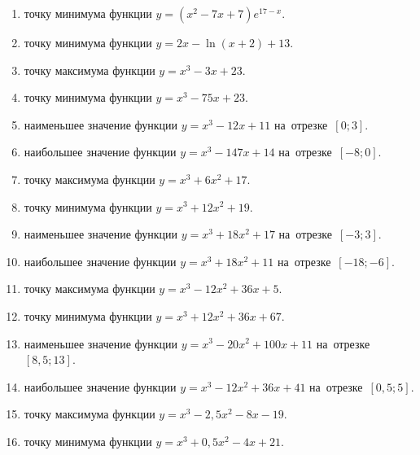 \documentclass[a4paper,10pt]{article}
\begin{document}
\begin{enumerate}
\item {} точку минимума функции $y=\left(x^2-7x+7\right){{e}^{17-x}}$.

\item {} точку минимума функции $y=2x-\ln \left(x+2\right)+13$.

\item {} точку максимума функции $y=x^3 -3x +23$.

\item {} точку минимума функции $y=x^3 -75x+23$.

\item {} наименьшее значение функции $y=x^3 -12x+11$ на~отрезке~$\left[0;3\right]$.

\item {} наибольшее значение функции $y=x^3 -147x+14$ на~отрезке~$\left[-8;0\right]$.

\item {} точку максимума функции $y=x^3 +6x^2+17$.

\item {} точку минимума функции $y=x^3 +12x^2+19$.

\item {} наименьшее значение функции $y=x^3 +18x^2+17$ на~отрезке~$\left[-3;3\right]$.

\item {} наибольшее значение функции $y=x^3 +18x^2+11$ на~отрезке~$\left[-18;-6\right]$.

\item {} точку максимума функции $y=x^3 -12x^2+36x+5$.

\item {} точку минимума функции $y=x^3 +12x^2+36x+67$.

\item {} наименьшее значение функции $y=x^3 -20x^2+100x+11$ на~отрезке~$\left[8,5;13\right]$.

\item {} наибольшее значение функции $y=x^3 -12x^2+36x+41$ на~отрезке~$\left[0,5;5\right]$.

\item {} точку максимума функции $y=x^3 -2,5x^2-8x-19$.

\item {} точку минимума функции $y=x^3 +0,5x^2-4x+21$.


\end{enumerate}
\end{document}
